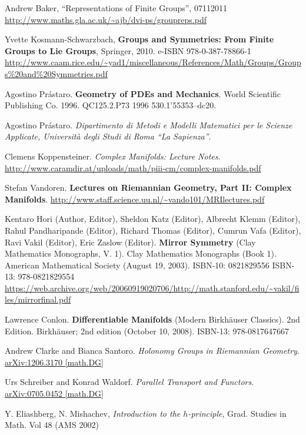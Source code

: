 \documentclass[10pt]{amsart}
\begin{document}
\begin{thebibliography}{9}
Andrew Baker, ``Representations of Finite Groups'', 07112011
\url{http://www.maths.gla.ac.uk/~ajb/dvi-ps/groupreps.pdf}

Yvette Kosmann-Schwarzbach, \textbf{Groups and Symmetries: From Finite Groups to Lie Groups}, Springer, 2010. e-ISBN 978-0-387-78866-1 \url{http://www.caam.rice.edu/~yad1/miscellaneous/References/Math/Groups/Groups\%20and\%20Symmetries.pdf}

Agostino Pr\'{a}staro.  \textbf{Geometry of PDEs and Mechanics}.  World Scientific Publishing Co.  1996.  QC125.2.P73 1996  530.1'55353--dc20.  

Agostino Pr\'{a}staro.  \emph{Dipartimento di Metodi e Modelli Matematici per le Scienze Applicate, Universit\`{a} degli Studi di Roma ``La Sapienza''}.  

  Clemens Koppensteiner.  \emph{Complex Manifolds: Lecture Notes}.  \url{http://www.caramdir.at/uploads/math/piii-cm/complex-manifolds.pdf}
  

Stefan Vandoren. \textbf{Lectures on Riemannian Geometry, Part II: Complex Manifolds}.  \url{http://www.staff.science.uu.nl/~vando101/MRIlectures.pdf} 

Kentaro Hori (Author, Editor), Sheldon Katz (Editor), Albrecht Klemm (Editor), Rahul Pandharipande (Editor), Richard Thomas (Editor), Cumrun Vafa (Editor), Ravi Vakil (Editor), Eric Zaslow (Editor).  \textbf{Mirror Symmetry} (Clay Mathematics Monographs, V. 1).  Clay Mathematics Monographs (Book 1).  American Mathematical Society (August 19, 2003).  ISBN-10: 0821829556  ISBN-13: 978-0821829554  \url{https://web.archive.org/web/20060919020706/http://math.stanford.edu/~vakil/files/mirrorfinal.pdf}

Lawrence Conlon.  \textbf{Differentiable Manifolds} (Modern Birkhäuser Classics).  2nd Edition.  Birkhäuser; 2nd edition (October 10, 2008).  ISBN-13: 978-0817647667




Andrew Clarke and Bianca Santoro.  \emph{Holonomy Groups in Riemannian Geometry}.  \href{https://arxiv.org/pdf/1206.3170.pdf}{arXiv:1206.3170 [math.DG]}

Urs Schreiber and Konrad Waldorf.  \emph{Parallel Transport and Functors}.  \href{https://arxiv.org/pdf/0705.0452.pdf}{arXiv:0705.0452 [math.DG]}

Y. Eliashberg, N. Mishachev, \emph{Introduction to the $h$-principle}, Grad. Studies in Math. Vol 48 (AMS 2002)


\end{thebibliography}
\end{document}

